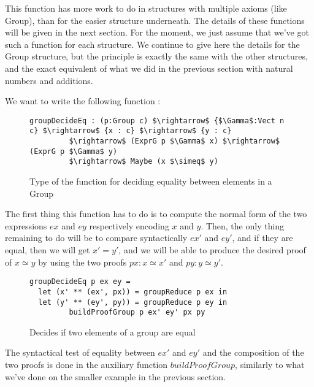 This function has more work to do in structures with multiple axioms (like Group), than for the easier structure underneath.
The details of these functions will be given in the next section. For the moment, we just assume that we've got such a function for each structure. We continue to give here the details for the Group structure, but the principle is exactly the same with the other structures, and the exact equivalent of what we did in the previous section with natural numbers and additions.

We want to write the following function :

\begin{figure}[H]
\figrule
\begin{center}
\begin{lstlisting}
groupDecideEq : (p:Group c) $\rightarrow$ {$\Gamma$:Vect n c} $\rightarrow$ {x : c} $\rightarrow$ {y : c} 
	     $\rightarrow$ (ExprG p $\Gamma$ x) $\rightarrow$ (ExprG p $\Gamma$ y) 
	     $\rightarrow$ Maybe (x $\simeq$ y)
\end{lstlisting}
\end{center}
\caption{Type of the function for deciding equality between elements in a Group}
\figrule
\end{figure}

The first thing this function has to do is to compute the normal form of the two expressions $ex$ and $ey$ respectively encoding $x$ and $y$.
Then, the only thing remaining to do will be to compare syntactically $ex'$ and $ey'$, and if they are equal, then we will get $x'=y'$, and we will be able to produce the desired proof of $x \simeq y$ by using the two proofs $px : x \simeq x'$ and $py : y \simeq y'$. 

\begin{figure}[H]
\figrule
\begin{center}
\begin{lstlisting}
groupDecideEq p ex ey =
  let (x' ** (ex', px)) = groupReduce p ex in
  let (y' ** (ey', py)) = groupReduce p ey in
	     buildProofGroup p ex' ey' px py
\end{lstlisting}
\end{center}
\caption{Decides if two elements of a group are equal}
\figrule
\end{figure}

The syntactical test of equality between $ex'$ and $ey'$ and the composition of the two proofs is done in the auxiliary function $buildProofGroup$, similarly to what we've done on the smaller example in the previous section. 

